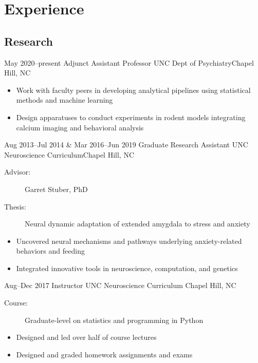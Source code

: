 \documentclass[11pt,a4paper,sans]{moderncv} %
\begin{document}
\section{Experience}
    \subsection{Research}
        \cventry
            {May 2020--present}
            {Adjunct Assistant Professor}
            {UNC Dept of Psychiatry}{Chapel Hill, NC}{}
            {
                \begin{itemize}
                    \item Work with faculty peers in developing analytical pipelines using statistical methods and machine learning
                    \item Design apparatuses to conduct experiments in rodent models integrating calcium imaging and behavioral analysis
                \end{itemize}
            }
        \cventry
            {Aug 2013--Jul 2014 \& Mar 2016--Jun 2019}
            {Graduate Research Assistant}
            {UNC Neuroscience Curriculum}{Chapel Hill, NC}{}
            {
                \begin{description}
                    \item[Advisor:] Garret Stuber, PhD
                    \item[Thesis:] Neural dynamic adaptation of extended amygdala to stress and anxiety
                \end{description}
                \begin{itemize}
                    \item Uncovered neural mechanisms and pathways underlying anxiety-related behaviors and feeding
                    \item Integrated innovative tools in neuroscience, computation, and genetics
                \end{itemize}
            }
        \cventry
            {Aug--Dec 2017}
            {Instructor}
            {UNC Neuroscience Curriculum}
            {Chapel Hill, NC}{}
            {
                \begin{description}
                    \item[Course:] Graduate-level on statistics and programming in Python
                \end{description}
                \begin{itemize}
                    \item Designed and led over half of course lectures
                    \item Designed and graded homework assignments and exams
                \end{itemize}
            }
\end{document}
